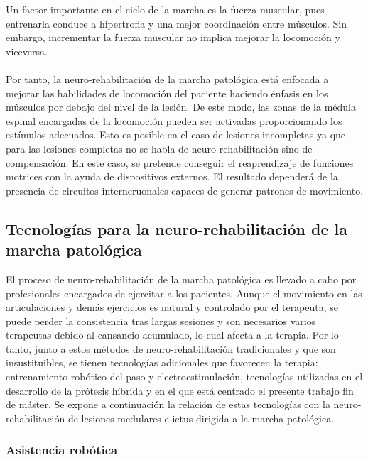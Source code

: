 Un factor importante en el ciclo de la marcha es la fuerza muscular, pues entrenarla conduce a hipertrofia y una mejor coordinación entre músculos. Sin embargo, incrementar la fuerza muscular no implica mejorar la locomoción y viceversa\cite{recovery_locomotion}. 
\\
\\
Por tanto, la neuro-rehabilitación de la marcha patológica está enfocada a mejorar las habilidades de locomoción del paciente haciendo énfasis en los músculos por debajo del nivel de la lesión. De este modo, las zonas de la médula espinal encargadas de la locomoción pueden ser activadas proporcionando los estímulos adecuados. Esto es posible en el caso de lesiones incompletas ya que para las lesiones completas no se habla de neuro-rehabilitación sino de compensación. En este caso, se pretende conseguir el reaprendizaje de funciones motrices con la ayuda de dispositivos externos. El resultado dependerá de la presencia de circuitos interneruonales capaces de generar patrones de movimiento\cite{recovery_locomotion}.

\subsection{Tecnologías para la neuro-rehabilitación de la marcha patológica}
El proceso de neuro-rehabilitación de la marcha patológica es llevado a cabo por profesionales encargados de ejercitar a los pacientes. Aunque el movimiento en las articulaciones y demás ejercicios es natural y controlado por el terapeuta, se puede perder la consistencia tras largas sesiones y son necesarios varios terapeutas debido al cansancio acumulado, lo cual afecta a la terapia. Por lo tanto, junto a estos métodos de neuro-rehabilitación tradicionales y que son insustituibles, se tienen tecnologías adicionales que favorecen la terapia: entrenamiento robótico del paso y electroestimulación, tecnologías utilizadas en el desarrollo de la prótesis híbrida y en el que está centrado el presente trabajo fin de máster. Se expone a continuación la relación de estas tecnologías con la neuro-rehabilitación de lesiones medulares e ictus dirigida a la marcha patológica.

\subsubsection{Asistencia robótica}

